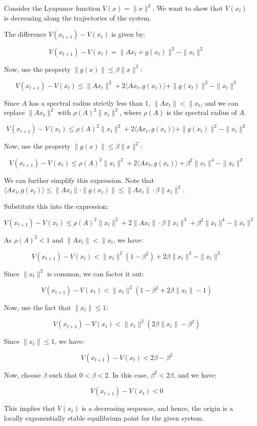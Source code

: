 \documentclass{article}
\begin{document}
Consider the Lyapunov function \(V(x) = \|x\|^2\). We want to show that \(V(x_t)\) is decreasing along the trajectories of the system. 

The difference \(V(x_{t+1}) - V(x_t)\) is given by:

\[
V(x_{t+1}) - V(x_t) = \|A x_t + g(x_t)\|^2 - \|x_t\|^2
\]

Now, use the property \(\|g(x)\| \leq \beta \|x\|^2\):

\[
V(x_{t+1}) - V(x_t) \leq \|A x_t\|^2 + 2 \langle A x_t, g(x_t) \rangle + \|g(x_t)\|^2 - \|x_t\|^2
\]

Since \(A\) has a spectral radius strictly less than 1, \(\|A x_t\| < \|x_t\), and we can replace \(\|A x_t\|^2\) with \(\rho(A)^2 \|x_t\|^2\), where \(\rho(A)\) is the spectral radius of \(A\).


\[
V(x_{t+1}) - V(x_t) \leq \rho(A)^2 \|x_t\|^2 + 2 \langle A x_t, g(x_t) \rangle + \|g(x_t)\|^2 - \|x_t\|^2
\]

Now, use the property \(\|g(x)\| \leq \beta \|x\|^2\):

\[
V(x_{t+1}) - V(x_t) \leq \rho(A)^2 \|x_t\|^2 + 2 \langle A x_t, g(x_t) \rangle + \beta^2 \|x_t\|^4 - \|x_t\|^2
\]

We can further simplify this expression. Note that \(\langle A x_t, g(x_t) \rangle \leq \|A x_t\| \cdot \|g(x_t)\| \leq \|A x_t\| \cdot \beta \|x_t\|^2\). 

Substitute this into the expression:

\[
V(x_{t+1}) - V(x_t) \leq \rho(A)^2 \|x_t\|^2 + 2 \|A x_t\| \cdot \beta \|x_t\|^3 + \beta^2 \|x_t\|^4 - \|x_t\|^2
\]

As \(\rho(A)^2 < 1\) and \(\|A x_t\| < \|x_t\), we have:

\[
V(x_{t+1}) - V(x_t) < \|x_t\|^2 (1 - \beta^2) + 2 \beta \|x_t\|^3 - \|x_t\|^2
\]

Since \(\|x_t\|^2\) is common, we can factor it out:

\[
V(x_{t+1}) - V(x_t) < \|x_t\|^2 \left(1 - \beta^2 + 2 \beta \|x_t\| - 1\right)
\]

Now, use the fact that \(\|x_t\| \leq 1\):

\[
V(x_{t+1}) - V(x_t) < \|x_t\|^2 \left(2 \beta \|x_t\| - \beta^2\right)
\]

Since \(\|x_t\| \leq 1\), we have:

\[
V(x_{t+1}) - V(x_t) < 2 \beta - \beta^2
\]

Now, choose \(\beta\) such that \(0 < \beta < 2\). In this case, \(\beta^2 < 2 \beta\), and we have:

\[
V(x_{t+1}) - V(x_t) < 0
\]

This implies that \(V(x_t)\) is a decreasing sequence, and hence, the origin is a locally exponentially stable equilibrium point for the given system.
\end{document}
